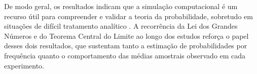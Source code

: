 De modo geral, os resultados indicam que a simulação computacional é um recurso útil
para compreender e validar a teoria da probabilidade, sobretudo em situações de
difícil tratamento analítico \cite{harcholbalter2024probability}. A recorrência da
Lei dos Grandes Números e do Teorema Central do Limite ao longo dos estudos reforça
o papel desses dois resultados, que sustentam tanto a estimação de probabilidades
por frequência quanto o comportamento das médias amostrais observado em cada
experimento.
